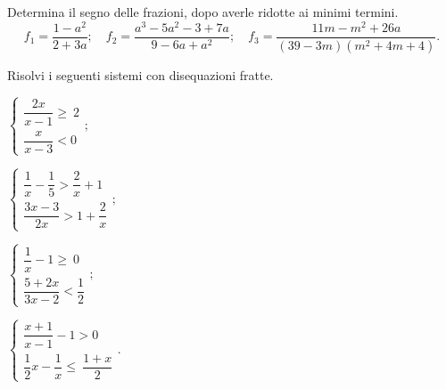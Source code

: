 \begin{esercizio}
\label{ese:18.71}
Determina il segno delle frazioni, dopo averle ridotte ai minimi termini.
\[f_{1}=\dfrac{1-a^{2}}{2+3a};\quad f_{2}=\dfrac{a^{3}-5a^{2}-3+7a}{9-6a+a^{2}};\quad f_{3}=\dfrac{11m-m^{2}+26a}{(39-3m)(m^{2}+4m+4)}.\]
\end{esercizio}

\begin{esercizio}[\Ast]
\label{ese:18.72}
Risolvi i seguenti sistemi con disequazioni fratte.
\begin{multicols}{2}
\begin{enumeratea}{\longarray
 \item $\left\{\begin{array}{l}
		\dfrac{2x}{x-1}\ge~2\\
		\dfrac{x}{x-3}<0
	\end{array}\right.;$
\item $\left\{\begin{array}{l}
        \dfrac{1}{x}-\dfrac{1}{5}>\dfrac{2}{x}+1\\
        \dfrac{3x-3}{2x}>1+\dfrac{2}{x}
       \end{array}\right.;$
\item $\left\{\begin{array}{l}
        \dfrac{1}{x}-1\ge~0\\
        \dfrac{5+2x}{3x-2}<\dfrac{1}{2}
	   \end{array}\right.;$
\item $\left\{\begin{array}{l}
	   \dfrac{x+1}{x-1}-1>0\\
	   \dfrac{1}{2}x-\dfrac{1}{x}\le~\dfrac{1+x}{2}
	   \end{array}\right..$}
\end{enumeratea}
\end{multicols}
\end{esercizio}

